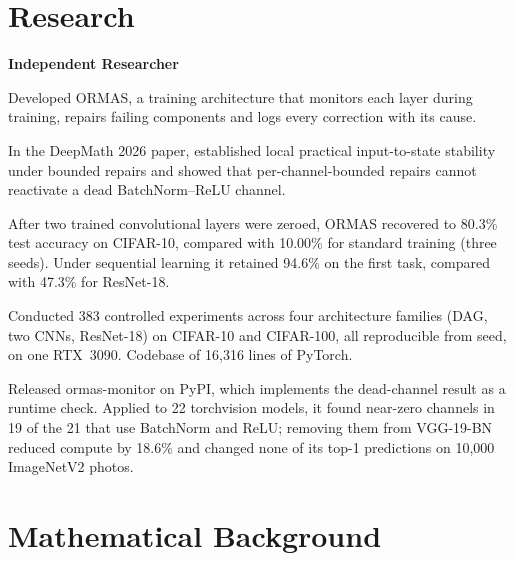 \documentclass[10pt,a4paper]{article}
\newcommand{\cvitem}[3]{%
  \begin{list}{}{%
    \setlength{\leftmargin}{2.35cm}%
    \setlength{\labelwidth}{2.1cm}%
    \setlength{\labelsep}{0.25cm}%
    \setlength{\itemindent}{0pt}%
    \setlength{\listparindent}{0pt}%
    \setlength{\rightmargin}{0pt}%
    \setlength{\topsep}{0pt}%
    \setlength{\partopsep}{0pt}%
    \setlength{\parsep}{0pt}%
    \setlength{\itemsep}{0pt}%
  }%
  \item[{\makebox[2.1cm][l]{\footnotesize\color{muted}#1}}]%
  #2
  #3
  \end{list}%
  \vspace{1.5pt}
}
\begin{document}
\section*{Research}

\vspace{3pt}
\cvitem{2024--present}{%
  \textbf{Independent Researcher} \quad {\small ORMAS: self-repairing neural networks}
}{%
  \begin{bullets}
    \item Developed ORMAS, a training architecture that monitors each layer during training, repairs failing components and logs every correction with its cause.
    \item In the DeepMath 2026 paper, established local practical input-to-state stability under bounded repairs and showed that per-channel-bounded repairs cannot reactivate a dead BatchNorm--ReLU channel.
    \item After two trained convolutional layers were zeroed, ORMAS recovered to 80.3\% test accuracy on CIFAR-10, compared with 10.00\% for standard training (three seeds). Under sequential learning it retained 94.6\% on the first task, compared with 47.3\% for \mbox{ResNet-18}.
    \item Conducted 383 controlled experiments across four architecture families (DAG, two CNNs, \mbox{ResNet-18}) on CIFAR-10 and CIFAR-100, all reproducible from seed, on one RTX~3090. Codebase of 16,316 lines of PyTorch.
    \item Released ormas-monitor on PyPI, which implements the dead-channel result as a runtime check. Applied to 22 torchvision models, it found near-zero channels in 19 of the 21 that use BatchNorm and ReLU; removing them from VGG-19-BN reduced compute by 18.6\% and changed none of its top-1 predictions on 10,000 ImageNetV2 photos.
  \end{bullets}
}

\section*{Mathematical Background}
\end{document}
